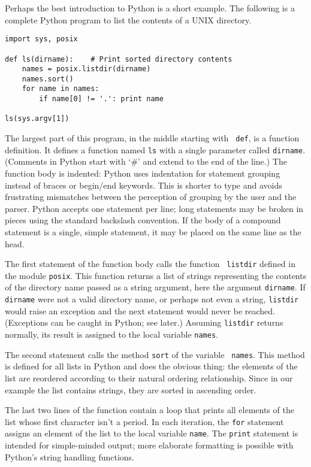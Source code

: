 Perhaps the best introduction to Python is a short example.  The
following is a complete Python program to list the contents of a UNIX
directory.
\begin{verbatim}
import sys, posix

def ls(dirname):    # Print sorted directory contents
    names = posix.listdir(dirname)
    names.sort()
    for name in names:
        if name[0] != '.': print name

ls(sys.argv[1])
\end{verbatim}
The largest part of this program, in the middle starting with {\tt
def}, is a function definition.  It defines a function named {\tt ls}
with a single parameter called {\tt dirname}.  (Comments in Python
start with `\#' and extend to the end of the line.)  The function body
is indented: Python uses indentation for statement grouping instead of
braces or begin/end keywords.  This is shorter to type and avoids
frustrating mismatches between the perception of grouping by the user
and the parser.  Python accepts one statement per line; long
statements may be broken in pieces using the standard backslash
convention.  If the body of a compound statement is a single, simple
statement, it may be placed on the same line as the head.

The first statement of the function body calls the function {\tt
listdir} defined in the module {\tt posix}.  This function returns a
list of strings representing the contents of the directory name passed
as a string argument, here the argument {\tt dirname}.  If {\tt
dirname} were not a valid directory name, or perhaps not even a
string, {\tt listdir} would raise an exception and the next statement
would never be reached.  (Exceptions can be caught in Python; see
later.)  Assuming {\tt listdir} returns normally, its result is
assigned to the local variable {\tt names}.

The second statement calls the method {\tt sort} of the variable {\tt
names}.  This method is defined for all lists in Python and does the
obvious thing: the elements of the list are reordered according to
their natural ordering relationship.  Since in our example the list
contains strings, they are sorted in ascending \ASCII{} order.

The last two lines of the function contain a loop that prints all
elements of the list whose first character isn't a period.  In each
iteration, the {\tt for} statement assigns an element of the list to
the local variable {\tt name}.  The {\tt print} statement is intended
for simple-minded output; more elaborate formatting is possible with
Python's string handling functions.

